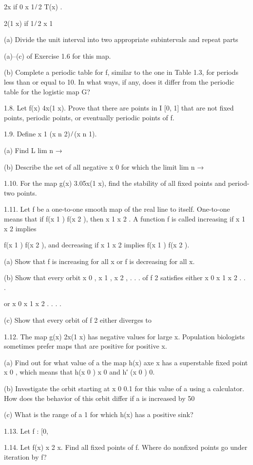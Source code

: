 2x if 0 x 1 ̸ 2 T(x)  . { 2(1  x) if 1 ̸ 2 x 1

(a) Divide the unit interval into two appropriate subintervals and repeat parts

(a)–(c) of Exercise 1.6 for this map.

(b) Complete a periodic table for f, similar to the one in Table 1.3, for periods less than or equal to 10. 
In what ways, if any, does it differ from the periodic table for the logistic map G?

1.8. Let f(x)  4x(1  x). Prove that there are points in I  [0, 1] that are not ﬁxed points, periodic 
points, or eventually periodic points of f.

1.9. Deﬁne x 1  (x n 2) ̸ (x n 1).

(a) Find L  lim n →   

(b) Describe the set of all negative x 0 for which the limit lim n → 

1.10. For the map g(x)  3.05x(1  x), ﬁnd the stability of all ﬁxed points and period-two points.

1.11. Let f be a one-to-one smooth map of the real line to itself. One-to-one means that if f(x 1 )  f(x 2 
), then x 1  x 2 . A function f is called increasing if x 1  x 2 implies

f(x 1 )  f(x 2 ), and decreasing if x 1  x 2 implies f(x 1 ) 
 f(x 2 ).

(a) Show that f is increasing for all x or f is decreasing for all x.

(b) Show that every orbit x 0 , x 1 , x 2 , . . .  of f 2 satisﬁes either x 0 
 x 1 
 x 2 
 . . .

or x 0 x 1 x 2 . . . .

(c) Show that every orbit of f 2 either diverges to 

1.12. The map g(x)  2x(1  x) has negative values for large x. Population biologists sometimes prefer maps 
that are positive for positive x.

(a) Find out for what value of a the map h(x)  axe x has a superstable ﬁxed point x 0 , which means that 
h(x 0 )  x 0 and h′ (x 0 )  0.

(b) Investigate the orbit starting at x 0  0.1 for this value of a using a calculator. How does the 
behavior of this orbit differ if a is increased by 50%

(c) What is the range of a 
 1 for which h(x) has a positive sink?

1.13. Let f : [0, 

1.14. Let f(x)  x 2 x. Find all ﬁxed points of f. Where do nonﬁxed points go under iteration by f?

}
